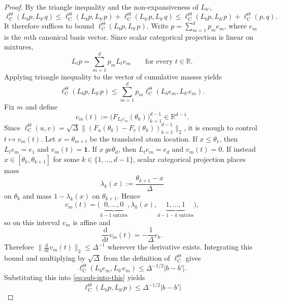 \documentclass[10pt,a4paper]{amsart}
\newcommand{\R}{\mathbb{R}}
\begin{document}
\begin{proof}
By the triangle inequality and the non-expansiveness of $L_{b'}$,
\begin{equation}
\ell^\Theta_{\mathrm C}(L_b p, L_{b'}q) \le \ell^\Theta_\mathrm C(L_b p, L_{b'}p) + \ell^\Theta_\mathrm C(L_{b'} p, L_{b'} q) \le \ell^\Theta_\mathrm C(L_b p, L_{b'}p) +\ell^\Theta_\mathrm C(p, q).
\end{equation}
It therefore suffices to bound $\ell^\Theta_\mathrm C(L_b p, L_{b'}p)$. Write $p = \sum_{m=1}^d p_m e_m$, where $e_m$ is the $m$th canonical basis vector. Since scalar categorical projection is linear on mixtures,
\begin{equation}
L_t p = \sum_{m=1}^d p_m L_t e_m\qquad\text{for every } t \in \R.
\end{equation}
Applying triangle inequality to the vector of cumulative masses yields
\begin{equation}\label{eq:sub-into-this}
\ell^\Theta_\mathrm C(L_b p, L_{b'}p) \le \sum_{m=1}^d p_m\ell^\Theta_\mathrm C(L_b e_m, L_{b'}e_m).
\end{equation}
Fix $m$ and define
\begin{equation}
v_m(t) := \bigl(F_{L_t e_m}(\theta_k)\bigr)_{k=1}^{d-1} \in \R^{d-1}.
\end{equation}
Since $\ell^\Theta_\mathrm C(u,v) = \sqrt{\Delta}\bigl\lVert (F_u(\theta_k) - F_v(\theta_k))_{k=1}^{d-1}\bigr\rVert_2$, it is enough to control $t \mapsto v_m(t)$. Let $x = \theta_{m+t}$ be the translated atom location. If $x \le \theta_1$, then $L_t e_m = e_1$ and $v_m(t) = \mathbf 1$. If $x \ ge \theta_d$, then $L_t e_m = e_d$ and $v_m(t) = 0$. If instead $x \in [\theta_k, \theta_{k+1}]$ for some $k \in \{1, \dots, d-1\}$, scalar categorical projection places mass
\begin{equation}
\lambda_k(x) := \frac{\theta_{k+1} -x}{\Delta}
\end{equation}
on $\theta_k$ and mass $1 - \lambda_k(x)$ on $\theta_{k+1}$. Hence
\begin{equation}
v_m(t) = \bigl(\underbrace{0,\dots,0}_{k-1 \text{ entries}},\lambda_k(x),\underbrace{1, \dots, 1}_{d-1-k\text{ entries}}\bigr),
\end{equation}
so on this interval $v_m$ is affine and
\begin{equation}
\frac{\mathrm d}{\mathrm dt} v_m(t) = -\frac{1}{\Delta}e_k.
\end{equation}
Therefore $\bigl\lVert\frac{\mathrm d}{\mathrm dt} v_m(t) \bigr\rVert_2 \le \Delta^{-1}$ wherever the derivative exists. Integrating this bound and multiplying by $\sqrt{\Delta}$ from the definition of $\ell^\Theta_\mathrm C$ gives
\begin{equation}
\ell^\Theta_\mathrm C(L_b e_m, L_{b'}e_m) \le \Delta^{-1/2}\lvert b- b'\rvert.
\end{equation}
Substituting this into \eqref{eq:sub-into-this} yields
\begin{equation}
\ell^\Theta_\mathrm C(L_b p, L_{b'}p) \le \Delta^{-1/2}\lvert b- b'\rvert
\end{equation}
\end{proof}
\end{document}
